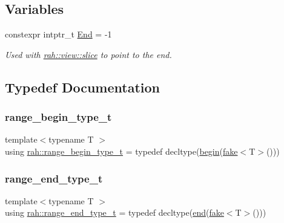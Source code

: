 \subsection*{Variables}
\begin{DoxyCompactItemize}
\item 
constexpr intptr\+\_\+t \mbox{\hyperlink{namespacerah_a5af06eebbd592c36368022990839b982}{End}} = -\/1
\begin{DoxyCompactList}\small\item\em Used with \mbox{\hyperlink{namespacerah_1_1view_a419374b95b3b9601655b0edf753963c3}{rah\+::view\+::slice}} to point to the end. \end{DoxyCompactList}\end{DoxyCompactItemize}


\subsection{Typedef Documentation}
\mbox{\label{namespacerah_a28aff4eeddcece6be65ff0b956d32d4a}} 
\subsubsection{\texorpdfstring{range\_begin\_type\_t}{range\_begin\_type\_t}}
{\footnotesize\ttfamily template$<$typename T $>$ \\
using \mbox{\hyperlink{namespacerah_a28aff4eeddcece6be65ff0b956d32d4a}{rah\+::range\+\_\+begin\+\_\+type\+\_\+t}} = typedef decltype(\mbox{\hyperlink{namespacerah_acccec48f25fb1a805854818f05d7b616}{begin}}(\mbox{\hyperlink{namespacerah_aa659f5ae02cb923cd8813f96cfd86a25}{fake}}$<$T$>$()))}

\mbox{\label{namespacerah_a9657e24ae477f4482225b133fe286b65}} 
\subsubsection{\texorpdfstring{range\_end\_type\_t}{range\_end\_type\_t}}
{\footnotesize\ttfamily template$<$typename T $>$ \\
using \mbox{\hyperlink{namespacerah_a9657e24ae477f4482225b133fe286b65}{rah\+::range\+\_\+end\+\_\+type\+\_\+t}} = typedef decltype(\mbox{\hyperlink{namespacerah_a20a3e45aee90bb5534a00c6b14e06069}{end}}(\mbox{\hyperlink{namespacerah_aa659f5ae02cb923cd8813f96cfd86a25}{fake}}$<$T$>$()))}

